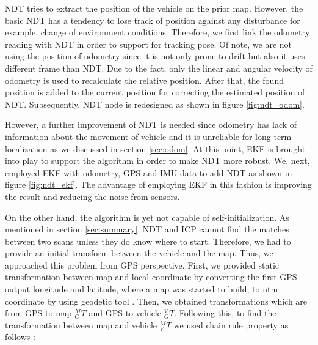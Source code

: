 \par\noindent NDT tries to extract the position of the vehicle on the prior map. However, the basic NDT has a tendency to lose track of position against any disturbance for example, change of environment conditions. Therefore, we first link the odometry reading with NDT in order to support for tracking pose. Of note, we are not using the position of odometry since it is not only prone to drift but also it uses different frame than NDT. Due to the fact, only the linear and angular velocity of odometry is used to recalculate the relative position. After that, the found position is added to the current position for correcting the estimated position of NDT. Subsequently, NDT node is redesigned as shown in figure \ref{fig:ndt_odom}.

\par However, a further improvement of NDT is needed since odometry has lack of information about the movement of vehicle and it is unreliable for long-term localization as we discussed in section \ref{sec:odom}. At this point, EKF is brought into play to support the algorithm in order to make NDT more robust. We, next, employed EKF with odometry, GPS and IMU data to add NDT as shown in figure \ref{fig:ndt_ekf}. The advantage of employing EKF in this fashion is improving the result and reducing the noise from sensors.
\par On the other hand, the algorithm is yet not capable of self-initialization. As mentioned in section \ref{sec:summary}, NDT and ICP cannot find the matches between two scans unless they do know where to start. Therefore, we had to provide an initial transform between the vehicle and the map. Thus, we approached this problem from GPS perspective. First, we provided static transformation between map and local coordinate by converting the first GPS output longitude and latitude, where a map was started to build, to \acrfull{utm} coordinate by using geodetic tool \cite{utm}. Then, we obtained transformations which are from GPS to map $_{G}^{M}T$ and GPS to vehicle $_{G}^{V}T$. Following this, to find the transformation between map and vehicle $_{V}^{M}T$ we used chain rule property as follows \cite{robotic}:
